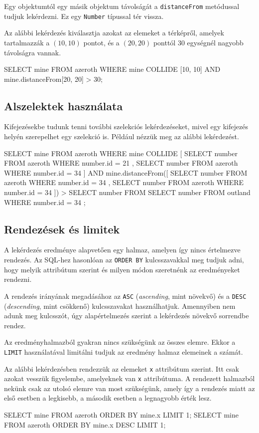 Egy objektumtól egy másik objektum távolságát a \texttt{distanceFrom} metódussal tudjuk lekérdezni. Ez egy \texttt{Number} típussal tér vissza.

Az alábbi lekérdezés kiválasztja azokat az elemeket a térképről, amelyek tartalmazzák a $(10, 10)$ pontot, és a $(20, 20)$ ponttól 30 egységnél nagyobb távolságra vannak.
\begin{sql}
SELECT mine
FROM azeroth
WHERE mine COLLIDE [10, 10] AND mine.distanceFrom[20, 20] > 30;
\end{sql}

\subsection{Alszelektek használata}

Kifejezésekbe tudunk tenni további szelekciós lekérdezéseket, mivel egy kifejezés helyén szerepelhet egy szelekció is. Például nézzük meg az alábbi lekérdezést.
\begin{sql}
SELECT mine FROM azeroth
WHERE mine COLLIDE [
    { SELECT number FROM azeroth WHERE number.id = 21 },
    { SELECT number FROM azeroth WHERE number.id = 34 }
] AND
mine.distanceFrom([
    { SELECT number FROM azeroth WHERE number.id = 34 },
    { SELECT number FROM azeroth WHERE number.id = 34 }])
    >
    { SELECT number FROM { SELECT number FROM outland }
      WHERE number.id = 34
    };
\end{sql}

\subsection{Rendezések és limitek}

A lekérdezés eredménye alapvetően egy halmaz, amelyen így nincs értelmezve rendezés. Az SQL-hez hasonlóan az \texttt{ORDER BY} kulcsszavakkal meg tudjuk adni, hogy melyik attribútum szerint és milyen módon szeretnénk az eredményeket rendezni.

A rendezés irányának megadásához az \texttt{ASC} (\textit{ascending}, mint növekvő) és a \texttt{DESC} (\textit{descending}, mint csökkenő) kulcsszavakat használhatjuk. Amennyiben nem adunk meg kulcsszót, úgy alapértelmezés szerint a lekérdezés növekvő sorrendbe rendez.

Az eredményhalmazból gyakran nincs szükségünk az összes elemre. Ekkor a \texttt{LIMIT} használatával limitálni tudjuk az eredmény halmaz elemeinek a számát.

Az alábbi lekérdezésben rendezzük az elemeket \texttt{x} attribútum szerint. Itt csak azokat vesszük figyelembe, amelyeknek van \texttt{x} attribútuma. A rendezett halmazból nekünk csak az utolsó elemre van most szükségünk, amely így a rendezés miatt az első esetben a legkisebb, a második esetben a legnagyobb érték lesz.
\begin{sql}
SELECT mine FROM azeroth ORDER BY mine.x LIMIT 1;
SELECT mine FROM azeroth ORDER BY mine.x DESC LIMIT 1;
\end{sql}

